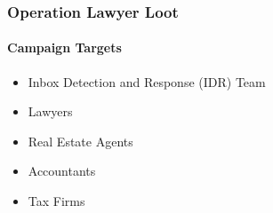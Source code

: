 \documentclass[aspectratio=169]{beamer}
\begin{document}
{%
\begin{frame}
  \frametitle{Operation Lawyer Loot}
  \framesubtitle{Campaign Targets}
  \begin{itemize}
    \item{Inbox Detection and Response (IDR)} Team
    \item{Lawyers}
    \item{Real Estate Agents}
    \item{Accountants}
    \item{Tax Firms}
  \end{itemize}
\end{frame}
}
\end{document}
